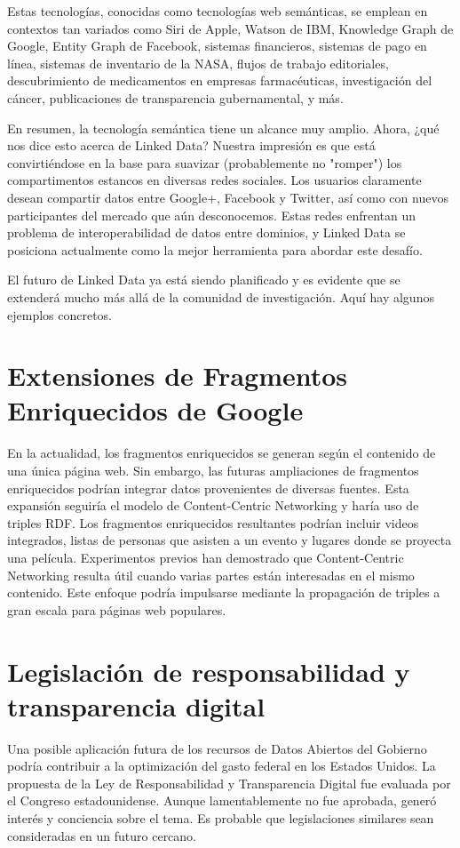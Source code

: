 \documentclass[11pt]{report}
\begin{document}
Estas tecnologías, conocidas como tecnologías web semánticas, se emplean en contextos tan variados como Siri de Apple, Watson de IBM, Knowledge Graph de Google, Entity Graph de Facebook, sistemas financieros, sistemas de pago en línea, sistemas de inventario de la NASA, flujos de trabajo editoriales, descubrimiento de medicamentos en empresas farmacéuticas, investigación del cáncer, publicaciones de transparencia gubernamental, y más.

En resumen, la tecnología semántica tiene un alcance muy amplio. Ahora, ¿qué nos dice esto acerca de Linked Data? Nuestra impresión es que está convirtiéndose en la base para suavizar (probablemente no "romper") los compartimentos estancos en diversas redes sociales. Los usuarios claramente desean compartir datos entre Google+, Facebook y Twitter, así como con nuevos participantes del mercado que aún desconocemos. Estas redes enfrentan un problema de interoperabilidad de datos entre dominios, y Linked Data se posiciona actualmente como la mejor herramienta para abordar este desafío.

El futuro de Linked Data ya está siendo planificado y es evidente que se extenderá mucho más allá de la comunidad de investigación. Aquí hay algunos ejemplos concretos.

\section{Extensiones de Fragmentos Enriquecidos de Google}

		En la actualidad, los fragmentos enriquecidos se generan según el contenido de una única página web. Sin embargo, las futuras ampliaciones de fragmentos enriquecidos podrían integrar datos provenientes de diversas fuentes. Esta expansión seguiría el modelo de Content-Centric Networking y haría uso de triples RDF. Los fragmentos enriquecidos resultantes podrían incluir videos integrados, listas de personas que asisten a un evento y lugares donde se proyecta una película. Experimentos previos han demostrado que Content-Centric Networking resulta útil cuando varias partes están interesadas en el mismo contenido. Este enfoque podría impulsarse mediante la propagación de triples a gran escala para páginas web populares.
\section{Legislación de responsabilidad y transparencia digital}

		Una posible aplicación futura de los recursos de Datos Abiertos del Gobierno podría contribuir a la optimización del gasto federal en los Estados Unidos. La propuesta de la Ley de Responsabilidad y Transparencia Digital fue evaluada por el Congreso estadounidense. Aunque lamentablemente no fue aprobada, generó interés y conciencia sobre el tema. Es probable que legislaciones similares sean consideradas en un futuro cercano. 
  
\end{document}

